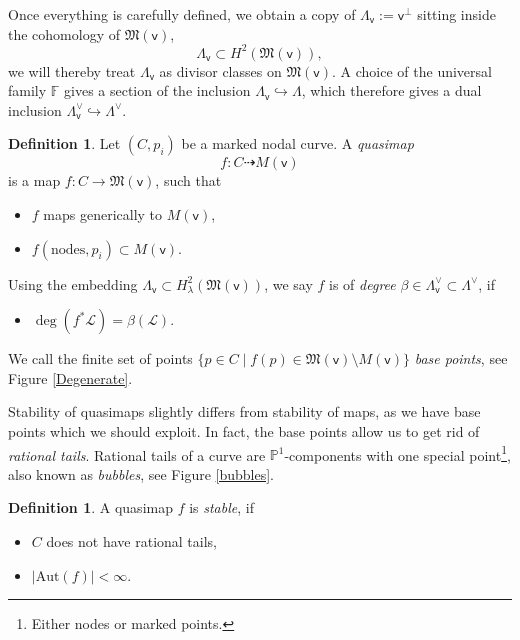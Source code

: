 \documentclass[11pt, reqno]{amsart}
\theoremstyle{plain}
\theoremstyle{definition}
\newtheorem{defn}[thm]{Definition}
\theoremstyle{remark}
\newcommand{\BF}{{\mathbb{F}}}
\newcommand{\CL}{{\mathcal L}}
\newcommand{\FM}{{\mathfrak{M}}}
\newcommand{\vsf}{{\mathsf{v}}}
\newcommand{\ch}{{\mathrm{ch}}}
\newcommand{\p}{\mathbb{P}}
\newcommand{\Aut}{\mathrm{Aut}}
\begin{document}
Once everything is carefully defined, we obtain a copy of $\Lambda_\vsf:=\vsf^\perp$ sitting inside the cohomology of $\FM(\vsf)$,
\[\Lambda_\vsf \subset H^2(\FM(\vsf)),\]
we will thereby  treat $\Lambda_\vsf$ as divisor classes on $\FM(\vsf)$.  A choice of the universal family $\BF$ gives a section of the inclusion $\Lambda_\vsf \hookrightarrow \Lambda $,  which therefore gives a dual inclusion $\Lambda_\vsf^\vee \hookrightarrow \Lambda^\vee$. 
\begin{defn}
	Let $(C,p_i)$ be a marked nodal curve. A \textit{quasimap} 
	\[f \colon C \dashrightarrow M(\vsf)\]
	 is a map $f \colon C \rightarrow \FM(\vsf)$, such that 
	 \begin{itemize}
	 	\item $f$ maps generically to $M(\vsf)$,
	 	\item $f(\text{nodes}, p_i) \subset M(\vsf)$.
	 	\end{itemize}
Using the embedding $\Lambda_\vsf \subset H^2_\lambda(\FM(\vsf))$, we say $f$ is of \textit{degree} $\beta \in \Lambda^\vee_\vsf \subset \Lambda^\vee$, if 
 	\begin{itemize}
 		\item $\deg(f^*\CL) =\beta(\CL).$ 
 		\end{itemize}
  We call the finite set of points $\{p \in C \mid f(p) \in \FM(\vsf)\setminus M(\vsf)\}$ \textit{base points}, see Figure \ref{Degenerate}.
 	\end{defn}
 Stability of quasimaps slightly differs from stability of maps, as we have base points which we should exploit. In fact, the base points allow us to get rid of \textit{rational tails}. Rational tails of a curve are $\p^1$-components with one special point\footnote{Either nodes or marked points.}, also known as \textit{bubbles}, see Figure \ref{bubbles}. 
 \begin{defn} \label{stableq} A quasimap $f$ is \textit{stable}, if 
 	\begin{itemize}
 		\item $C$ does not have rational tails,
 		\item $|\Aut(f)| <\infty$.
 		\end{itemize}
 	\end{defn}
\end{document}
